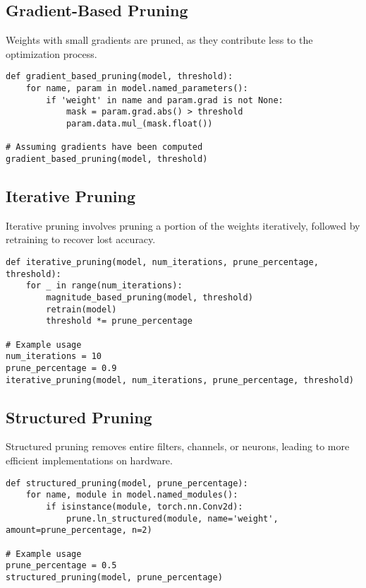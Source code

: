 \subsection{Gradient-Based Pruning}
Weights with small gradients are pruned, as they contribute less to the optimization process.

\begin{verbatim}
def gradient_based_pruning(model, threshold):
    for name, param in model.named_parameters():
        if 'weight' in name and param.grad is not None:
            mask = param.grad.abs() > threshold
            param.data.mul_(mask.float())

# Assuming gradients have been computed
gradient_based_pruning(model, threshold)
\end{verbatim}

\subsection{Iterative Pruning}
Iterative pruning involves pruning a portion of the weights iteratively, followed by retraining to recover lost accuracy.

\begin{verbatim}
def iterative_pruning(model, num_iterations, prune_percentage, threshold):
    for _ in range(num_iterations):
        magnitude_based_pruning(model, threshold)
        retrain(model)
        threshold *= prune_percentage

# Example usage
num_iterations = 10
prune_percentage = 0.9
iterative_pruning(model, num_iterations, prune_percentage, threshold)
\end{verbatim}

\subsection{Structured Pruning}
Structured pruning removes entire filters, channels, or neurons, leading to more efficient implementations on hardware.

\begin{verbatim}
def structured_pruning(model, prune_percentage):
    for name, module in model.named_modules():
        if isinstance(module, torch.nn.Conv2d):
            prune.ln_structured(module, name='weight', amount=prune_percentage, n=2)

# Example usage
prune_percentage = 0.5
structured_pruning(model, prune_percentage)
\end{verbatim}

